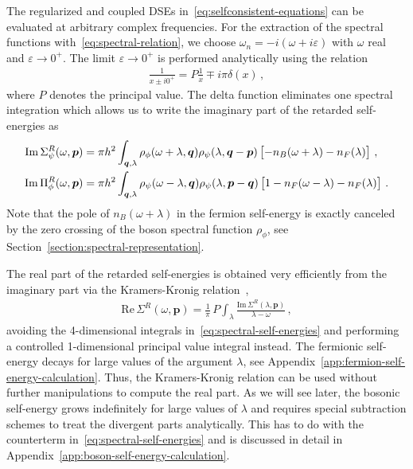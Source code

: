 The regularized and coupled DSEs in~\eqref{eq:selfconsistent-equations} can be evaluated at arbitrary complex frequencies. For the extraction of the spectral functions with~\eqref{eq:spectral-relation}, we choose $\omega_n=-i(\omega+i\varepsilon)$ with $\omega$ real and $\varepsilon\rightarrow 0^+$. The limit $\varepsilon\rightarrow 0^+$ is performed analytically using the relation
%
\begin{align}
	\label{eq:principal-value}
	\frac{1}{x\pm i0^+} = P\frac{1}{x} \mp i\pi\delta(x) \,,
\end{align}
%
where $P$ denotes the principal value. The delta function eliminates one spectral integration which allows us to write the imaginary part of the retarded self-energies as
%
\begin{align}
	\label{eq:imaginary-part-self-energies}
	\mathrm{Im}\,\Sigma^R_{\psi}(\omega,\bm{p}) &= \pi h^2\int_{\bm{q},\lambda}
	\rho_{\phi}(\omega+\lambda,\bm{q}) \rho_{\psi}(\lambda,\bm{q}-\bm{p})
	\left[-n_B(\omega+\lambda)-n_F(\lambda)\right] \,, \notag \\
	\mathrm{Im}\,\Pi^R_{\phi}(\omega,\bm{p}) &= \pi h^2\int_{\bm{q},\lambda}
	\rho_{\psi}(\omega-\lambda,\bm{q}) \rho_{\psi}(\lambda,\bm{p}-\bm{q})
	\left[1-n_F(\omega-\lambda)-n_F(\lambda)\right] \,.
\end{align}
%
Note that the pole of $n_B(\omega+\lambda)$ in the fermion self-energy is exactly canceled by the zero crossing of the boson spectral function $\rho_{\phi}$, see Section~\ref{section:spectral-representation}.

The real part of the retarded self-energies is obtained very efficiently from the imaginary part via the Kramers-Kronig relation~\cite{Abrikosov1975,Veillette2008},
%
\begin{align}
	\label{eq:kramers-kronig}
	\mathrm{Re}\,\Sigma^R(\omega,\bm{p}) = \frac{1}{\pi}\, P\int_{\lambda} \frac{\mathrm{Im}\, \Sigma^R(\lambda,\bm{p})}{\lambda-\omega} \,,
\end{align}
%
avoiding the 4-dimensional integrals in~\eqref{eq:spectral-self-energies} and performing a controlled 1-di\-men\-sio\-nal principal value integral instead. The fermionic self-energy decays for large values of the argument $\lambda$, see Appendix~\ref{app:fermion-self-energy-calculation}. Thus, the Kramers-Kronig relation can be used without further manipulations to compute the real part. As we will see later, the bosonic self-energy grows indefinitely for large values of $\lambda$ and requires special subtraction schemes to treat the divergent parts analytically. This has to do with the counterterm in~\eqref{eq:spectral-self-energies} and is discussed in detail in Appendix~\ref{app:boson-self-energy-calculation}.

